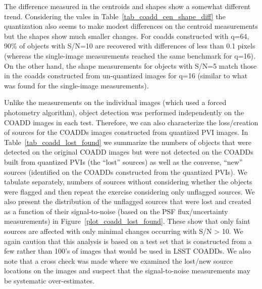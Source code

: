 The difference measured in the centroids and shapes show a somewhat different trend.  Considering the 
vales in Table~\ref{tab_coadd_cen_shape_diff} the quantization also seems to make modest differences on 
the centroid measurements but the shapes show much smaller changes.  For coadds constructed with q=64, 90\% 
of objects with S/N=10 are recovered with differences of less than 0.1 pixels (whereas the single-image
measurements reached the same benchmark for q=16).  On the other hand, the shape measurements for objects with
S/N=5 match those in the coadds constructed from un-quantized images for q=16 (similar to what was found 
for the single-image measurements).

Unlike the measurements on the individual images (which used a forced photometry algorithm), object detection 
was performed independently on the COADD images in each test.  Therefore, we can also characterize the 
loss/creation of sources for the COADDs images constructed from quantized PVI images.  
In Table~\ref{tab_coadd_lost_found} we summarize the numbers of objects that were detected on the original COADD 
images but were not detected on the COADDs built from quantized PVIs (the ``lost'' sources)
as well as the converse, ``new'' sources (identified on the COADDs constructed from the quantized PVIs).  We tabulate
separately, numbers of sources without considering whether the objects were flagged and then repeat the exercise 
considering only unflagged sources.  We also present the distribution of the unflagged sources
that were lost and created as a function of their signal-to-noise (based on the PSF flux/uncertainty measurements)
in Figure~\ref{plot_coadd_lost_found}.  These show that only faint sources are affected with only minimal changes 
occurring with S/N > 10.  We again caution that this analysis is based on a test set that is constructed from a few 
rather than 100's of images that would be used in LSST COADDs.  We also note that a cross check was made where we
examined the lost/new source locations on the images and suspect that the signal-to-noise measurements may be
systematic over-estimates.




